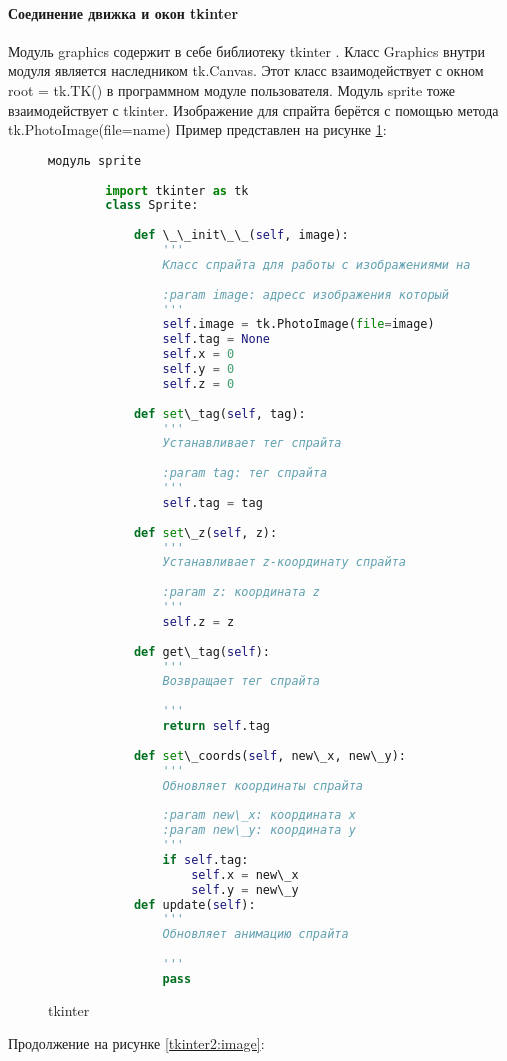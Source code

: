 \paragraph{Соединение движка и окон tkinter}
Модуль graphics содержит в себе библиотеку tkinter . Класс Graphics внутри модуля является наследником tk.Canvas. Этот класс взаимодействует с окном root = tk.TK() в программном модуле пользователя. Модуль sprite тоже взаимодействует с tkinter. Изображение для спрайта берётся с помощью метода tk.PhotoImage(file=name)
Пример представлен на рисунке \ref{tk:image}:
\begin{figure}[H]
	\begin{lstlisting}[language=Python]
		модуль sprite
		
		import tkinter as tk
		class Sprite:
	
			def \_\_init\_\_(self, image):
				'''
				Класс спрайта для работы с изображениями на Canvas
				
				:param image: адресс изображения который
				'''
				self.image = tk.PhotoImage(file=image)
				self.tag = None
				self.x = 0
				self.y = 0
				self.z = 0
				
			def set\_tag(self, tag):
				'''
				Устанавливает тег спрайта
				
				:param tag: тег спрайта
				'''
				self.tag = tag
				
			def set\_z(self, z):
				'''
				Устанавливает z-координату спрайта
				
				:param z: координата z
				'''
				self.z = z
				
			def get\_tag(self):
				'''
				Возвращает тег спрайта
				
				'''
				return self.tag
				
			def set\_coords(self, new\_x, new\_y):
				'''
				Обновляет координаты спрайта
				
				:param new\_x: координата x
				:param new\_y: координата y
				'''
				if self.tag:
					self.x = new\_x
					self.y = new\_y
			def update(self):
				'''
				Обновляет анимацию спрайта
				
				'''
				pass
	\end{lstlisting}  
\caption{tkinter}
\label{tk:image}
\end{figure}
Продолжение на рисунке \ref{tkinter2:image}:
